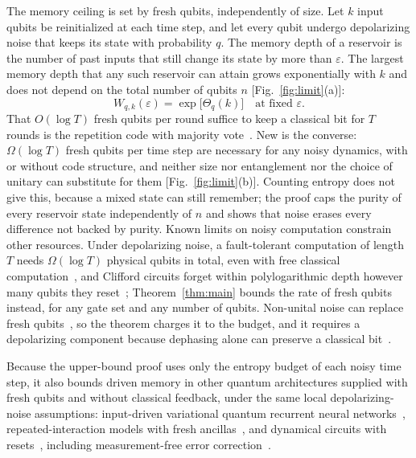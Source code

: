 \documentclass[aps,prl,twocolumn,superscriptaddress,floatfix]{revtex4-2}
\theoremstyle{plain}
\begin{document}
The memory ceiling is set by fresh qubits, independently of size. Let $k$ input qubits be reinitialized at each time step, and let every qubit undergo depolarizing noise that keeps its state with probability $q$. The memory depth of a reservoir is the number of past inputs that still change its state by more than $\varepsilon$. The largest memory depth that any such reservoir can attain grows exponentially with $k$ and does not depend on the total number of qubits $n$ [Fig.~\ref{fig:limit}(a)]:
\begin{equation}
W_{q,k}(\varepsilon)=\exp\!\big[\Theta_q(k)\big]\quad\text{at fixed }\varepsilon.
\label{eq:main}
\end{equation}
That $O(\log T)$ fresh qubits per round suffice to keep a classical bit for $T$ rounds is the repetition code with majority vote~\cite{vonNeumann1956}. New is the converse: $\Omega(\log T)$ fresh qubits per time step are necessary for any noisy dynamics, with or without code structure, and neither size nor entanglement nor the choice of unitary can substitute for them [Fig.~\ref{fig:limit}(b)]. Counting entropy does not give this, because a mixed state can still remember; the proof caps the purity of every reservoir state independently of $n$ and shows that noise erases every difference not backed by purity. Known limits on noisy computation constrain other resources. Under depolarizing noise, a fault-tolerant computation of length $T$ needs $\Omega(\log T)$ physical qubits in total, even with free classical computation~\cite{Fawzi2022}, and Clifford circuits forget within polylogarithmic depth however many qubits they reset~\cite{Nelson2026}; Theorem~\ref{thm:main} bounds the rate of fresh qubits instead, for any gate set and any number of qubits. Non-unital noise can replace fresh qubits~\cite{BenOr2013}, so the theorem charges it to the budget, and it requires a depolarizing component because dephasing alone can preserve a classical bit~\cite{SM}.

Because the upper-bound proof uses only the entropy budget of each noisy time step, it also bounds driven memory in other quantum architectures supplied with fresh qubits and without classical feedback, under the same local depolarizing-noise assumptions: input-driven variational quantum recurrent neural networks~\cite{Takaki2021}, repeated-interaction models with fresh ancillas~\cite{Cattaneo2021}, and dynamical circuits with resets~\cite{Yasuda2023,Hu2024}, including measurement-free error correction~\cite{Heussen2024}.
\end{document}

